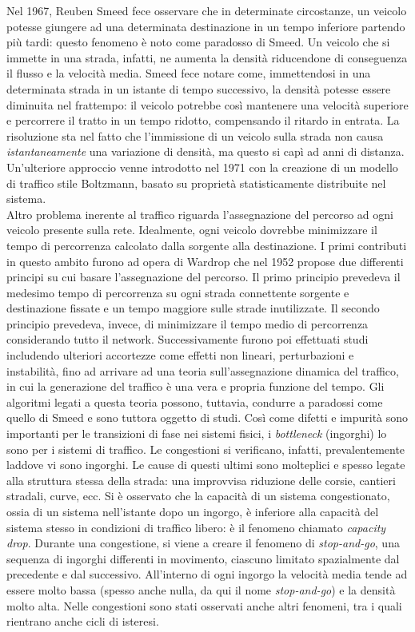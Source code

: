 \documentclass[../main.tex]{subfiles}
\begin{document}
Nel 1967, Reuben Smeed fece osservare che in determinate circostanze, un veicolo potesse giungere ad una determinata destinazione in un tempo inferiore partendo pi\`u tardi: questo fenomeno \`e noto come paradosso di Smeed.
Un veicolo che si immette in una strada, infatti, ne aumenta la densit\`a riducendone di conseguenza il flusso e la velocit\`a media.
Smeed fece notare come, immettendosi in una determinata strada in un istante di tempo successivo, la densit\`a potesse essere diminuita nel frattempo: il veicolo potrebbe cos\`i mantenere una velocit\`a superiore e percorrere il tratto in un tempo ridotto, compensando il ritardo in entrata.
La risoluzione sta nel fatto che l'immissione di un veicolo sulla strada non causa \emph{istantaneamente} una variazione di densit\`a, ma questo si cap\`i ad anni di distanza.
Un'ulteriore approccio venne introdotto nel 1971 con la creazione di un modello di traffico stile Boltzmann, basato su propriet\`a statisticamente distribuite nel sistema.\\
Altro problema inerente al traffico riguarda l'assegnazione del percorso ad ogni veicolo presente sulla rete.
Idealmente, ogni veicolo dovrebbe minimizzare il tempo di percorrenza calcolato dalla sorgente alla destinazione.
I primi contributi in questo ambito furono ad opera di Wardrop che nel 1952 propose due differenti principi su cui basare l'assegnazione del percorso.
Il primo principio prevedeva il medesimo tempo di percorrenza su ogni strada connettente sorgente e destinazione fissate e un tempo maggiore sulle strade inutilizzate.
Il secondo principio prevedeva, invece, di minimizzare il tempo medio di percorrenza considerando tutto il network.
Successivamente furono poi effettuati studi includendo ulteriori accortezze come effetti non lineari, perturbazioni e instabilit\`a, fino ad arrivare ad una teoria sull'assegnazione dinamica del traffico, in cui la generazione del traffico \`e una vera e propria funzione del tempo.
Gli algoritmi legati a questa teoria possono, tuttavia, condurre a paradossi come quello di Smeed e sono tuttora oggetto di studi.
Cos\`i come difetti e impurit\`a sono importanti per le transizioni di fase nei sistemi fisici, i \emph{bottleneck} (ingorghi) lo sono per i sistemi di traffico.
Le congestioni si verificano, infatti, prevalentemente laddove vi sono ingorghi.
Le cause di questi ultimi sono molteplici e spesso legate alla struttura stessa della strada: una improvvisa riduzione delle corsie, cantieri stradali, curve, ecc.
Si \`e osservato che la capacit\`a di un sistema congestionato, ossia di un sistema nell'istante dopo un ingorgo, \`e inferiore alla capacit\`a del sistema stesso in condizioni di traffico libero: \`e il fenomeno chiamato \emph{capacity drop}.
Durante una congestione, si viene a creare il fenomeno di \emph{stop-and-go}, una sequenza di ingorghi differenti in movimento, ciascuno limitato spazialmente dal precedente e dal successivo.
All'interno di ogni ingorgo la velocit\`a media tende ad essere molto bassa (spesso anche nulla, da qui il nome \emph{stop-and-go}) e la densit\`a molto alta.
Nelle congestioni sono stati osservati anche altri fenomeni, tra i quali rientrano anche cicli di isteresi.
\end{document}
